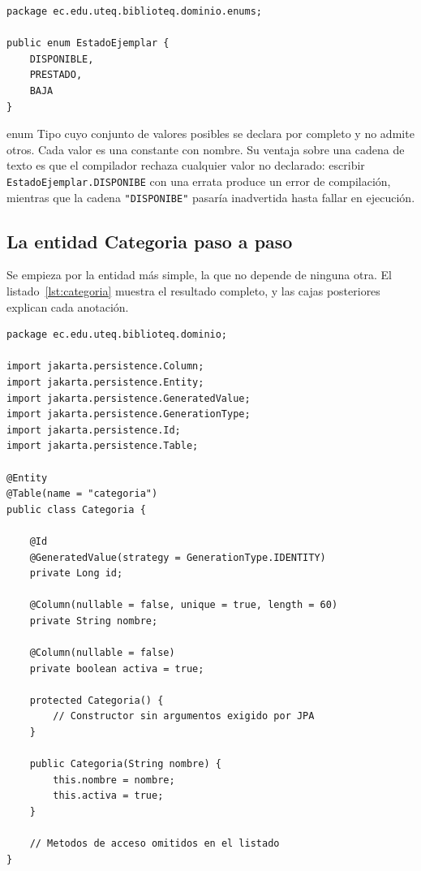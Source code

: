 \documentclass[11pt,a4paper,openany]{book}
\begin{document}
\begin{lstlisting}[style=java,caption={Enumeracion del estado de un ejemplar.},label={lst:enum}]
package ec.edu.uteq.biblioteq.dominio.enums;

public enum EstadoEjemplar {
	DISPONIBLE,
	PRESTADO,
	BAJA
}
\end{lstlisting}

\begin{cajadefinicion}{enum}
	Tipo cuyo conjunto de valores posibles se declara por completo y no admite otros. Cada valor es una constante con nombre. Su ventaja sobre una cadena de texto es que el compilador rechaza cualquier valor no declarado: escribir \texttt{EstadoEjemplar.DISPONIBE} con una errata produce un error de compilación, mientras que la cadena \texttt{"DISPONIBE"} pasaría inadvertida hasta fallar en ejecución.
\end{cajadefinicion}

\subsection{La entidad Categoria paso a paso}
\label{sec:entidad-categoria}

Se empieza por la entidad más simple, la que no depende de ninguna otra. El listado~\ref{lst:categoria} muestra el resultado completo, y las cajas posteriores explican cada anotación.

\begin{lstlisting}[style=java,caption={Entidad Categoria con sus anotaciones de mapeo.},label={lst:categoria}]
package ec.edu.uteq.biblioteq.dominio;

import jakarta.persistence.Column;
import jakarta.persistence.Entity;
import jakarta.persistence.GeneratedValue;
import jakarta.persistence.GenerationType;
import jakarta.persistence.Id;
import jakarta.persistence.Table;

@Entity
@Table(name = "categoria")
public class Categoria {

	@Id
	@GeneratedValue(strategy = GenerationType.IDENTITY)
	private Long id;

	@Column(nullable = false, unique = true, length = 60)
	private String nombre;

	@Column(nullable = false)
	private boolean activa = true;

	protected Categoria() {
		// Constructor sin argumentos exigido por JPA
	}

	public Categoria(String nombre) {
		this.nombre = nombre;
		this.activa = true;
	}

	// Metodos de acceso omitidos en el listado
}
\end{lstlisting}
\end{document}
